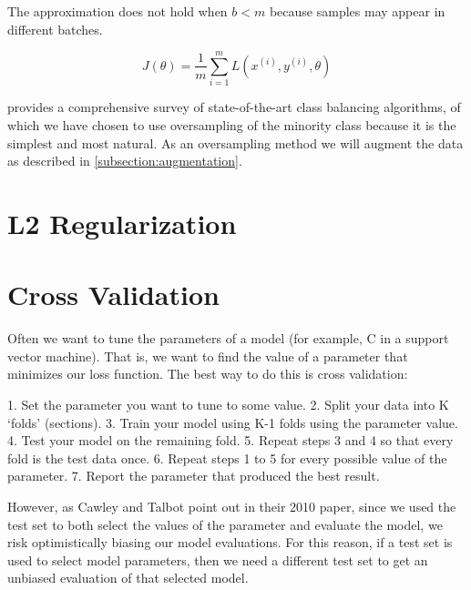 The approximation does not hold when $b < m$ because samples may appear in different batches.

$$
J(\theta) = \frac{1}{m} \sum_{i=1}^{m} L(x^{(i)}, y^{(i)}, \theta)
$$

\cite{haibo2009} provides a comprehensive survey of state-of-the-art class balancing algorithms, of which we have chosen to use oversampling of the minority class because it is the simplest and most natural. As an oversampling method we will augment the data as described in \ref{subsection:augmentation}.

\section{L2 Regularization}





\section{Cross Validation}

Often we want to tune the parameters of a model (for example, C in a support vector machine). That is, we want to find the value of a parameter that minimizes our loss function. The best way to do this is cross validation:

1. Set the parameter you want to tune to some value.
2. Split your data into K ‘folds’ (sections).
3. Train your model using K-1 folds using the parameter value.
4. Test your model on the remaining fold.
5. Repeat steps 3 and 4 so that every fold is the test data once.
6. Repeat steps 1 to 5 for every possible value of the parameter.
7. Report the parameter that produced the best result.

However, as Cawley and Talbot point out in their 2010 paper, since we used the test set to both select the values of the parameter and evaluate the model, we risk optimistically biasing our model evaluations. For this reason, if a test set is used to select model parameters, then we need a different test set to get an unbiased evaluation of that selected model.

